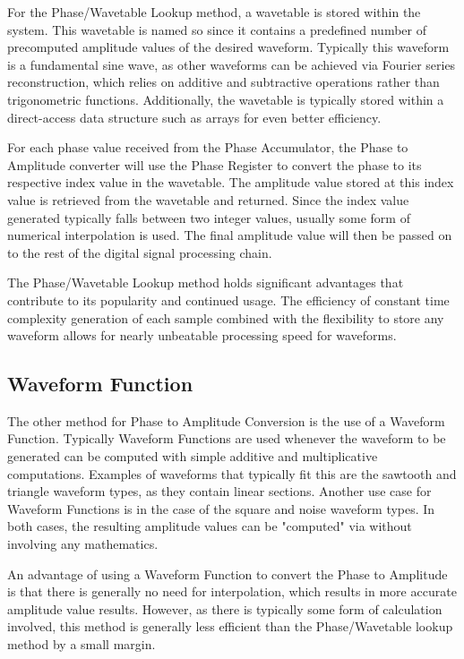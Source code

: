 \documentclass[a4paper,12pt]{report}
\begin{document}
For the Phase/Wavetable Lookup method, a wavetable is stored within the system. This wavetable is named so since it contains a predefined number of precomputed amplitude values of the desired waveform. Typically this waveform is a fundamental sine wave, as other waveforms can be achieved via Fourier series reconstruction, which relies on additive and subtractive operations rather than trigonometric functions. Additionally, the wavetable is typically stored within a direct-access data structure such as arrays for even better efficiency.


For each phase value received from the Phase Accumulator, the Phase to Amplitude converter will use the Phase Register to convert the phase to its respective index value in the wavetable. The amplitude value stored at this index value is retrieved from the wavetable and returned. Since the index value generated typically falls between two integer values, usually some form of numerical interpolation is used. The final amplitude value will then be passed on to the rest of the digital signal processing chain.

The Phase/Wavetable Lookup method holds significant advantages that contribute to its popularity and continued usage. The efficiency of constant time complexity generation of each sample combined with the flexibility to store any waveform allows for nearly unbeatable processing speed for waveforms.

\subsection{Waveform Function}
The other method for Phase to Amplitude Conversion is the use of a Waveform Function. Typically Waveform Functions are used whenever the waveform to be generated can be computed with simple additive and multiplicative computations. Examples of waveforms that typically fit this are the sawtooth and triangle waveform types, as they contain linear sections. Another use case for Waveform Functions is in the case of the square and noise waveform types. In both cases, the resulting amplitude values can be "computed" via without involving any mathematics.

An advantage of using a Waveform Function to convert the Phase to Amplitude is that there is generally no need for interpolation, which results in more accurate amplitude value results. However, as there is typically some form of calculation involved, this method is generally less efficient than the Phase/Wavetable lookup method by a small margin.
\end{document}
